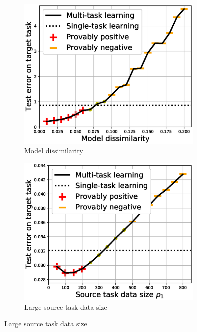 \begin{figure}
	\begin{subfigure}[b]{0.32\textwidth}
		\centering
		\includegraphics[width=0.98\textwidth]{figures/model_shift_phase_transition.eps}
		\caption{Model dissimilarity}
		\label{fig_model_shift}
	\end{subfigure}\hfill
	\begin{subfigure}[b]{0.32\textwidth}
		\centering
		\includegraphics[width=0.98\textwidth]{figures/datapoints_phase_transition.eps}
		\caption{Large source task data size}
	\end{subfigure}\hfill

\end{figure}
